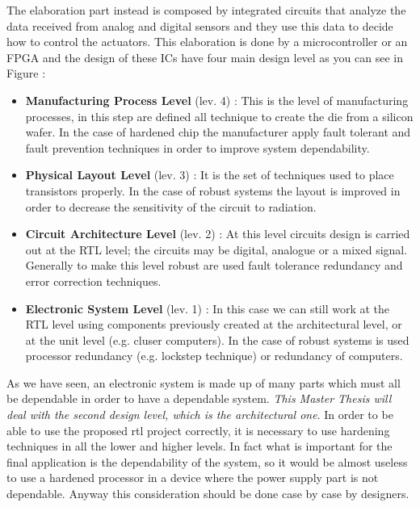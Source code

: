 {{{			The elaboration part instead is composed by integrated circuits that analyze the data received from analog and digital sensors and they use this data to decide how to control the actuators. This elaboration is done by a microcontroller or an FPGA and the design of these ICs have four main design level  as you can see in Figure :
			\begin{itemize}
				\item \textbf{Manufacturing Process Level } (lev. 4) : This is the level of manufacturing processes, in this step are defined all technique to create the die from a silicon wafer. In the case of hardened chip the manufacturer apply fault tolerant and fault prevention techniques in order to improve system dependability. 
				\item \textbf{Physical Layout Level} (lev. 3) : It is the set of techniques used to place transistors properly. In the case of robust systems the layout is improved in order to decrease the sensitivity of the circuit to radiation.
				\item \textbf{Circuit Architecture Level } (lev. 2) : At this level circuits design is carried out at the RTL level; the circuits may be digital, analogue or a mixed signal. Generally to make this level robust are used fault tolerance redundancy and error correction techniques.   
				\item \textbf{Electronic System Level } (lev. 1) : In this case we can still work at the RTL level using components previously created at the architectural level, or at the unit level (e.g. cluser computers). In the case of robust systems is used processor redundancy (e.g. lockstep technique) or redundancy of computers.
			\end{itemize}  
		
		
			As we have seen, an electronic system is made up of many parts which must all be dependable in order to have a dependable system. \textit{This Master Thesis will deal with the second design level, which is the architectural one}. In order to be able to use the proposed rtl project correctly, it is necessary to use hardening techniques in all the lower and higher levels. In fact what is important for the final application is the dependability of the system, so it would be almost useless to use a hardened processor in a device where the power supply part is not dependable. Anyway this consideration should be done case by case by designers. 
		
		} %
}}
